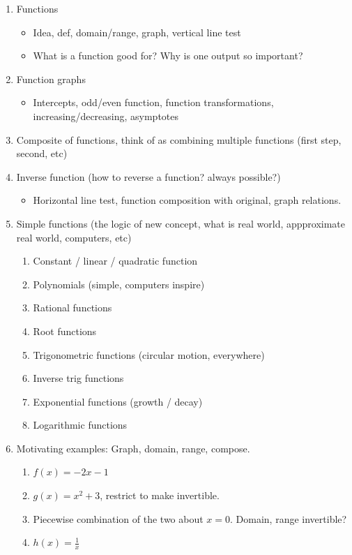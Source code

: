 \documentclass{article}
\begin{document}
\begin{enumerate}
\item Functions
\begin{itemize}
\item Idea, def, domain/range, graph, vertical line test
\item What is a function good for? Why is one output so important?
\end{itemize}
\item Function graphs
\begin{itemize}
\item Intercepts, odd/even function, function transformations, increasing/decreasing, asymptotes
\end{itemize}
\item Composite of functions, think of as combining multiple functions (first step, second, etc)
\item Inverse function (how to reverse a function? always possible?)
\begin{itemize}
\item Horizontal line test, function composition with original, graph relations.
\end{itemize}
\item Simple functions (the logic of new concept, what is real world, appproximate real world, computers, etc)
\begin{enumerate}
\item Constant / linear / quadratic function
\item Polynomials (simple, computers inspire)
\item Rational functions
\item Root functions
\item Trigonometric functions (circular motion, everywhere)
\item Inverse trig functions
\item Exponential functions (growth / decay)
\item Logarithmic functions
\end{enumerate}
\item Motivating examples: Graph, domain, range, compose.
\begin{enumerate}
\item $f(x) = -2x-1$
\item $g(x) = x^2+3$, restrict to make invertible.
\item Piecewise combination of the two about $x=0$. Domain, range invertible?
\item $h(x) = \frac{1}{x}$
\end{enumerate}
\end{enumerate}
\end{document}
